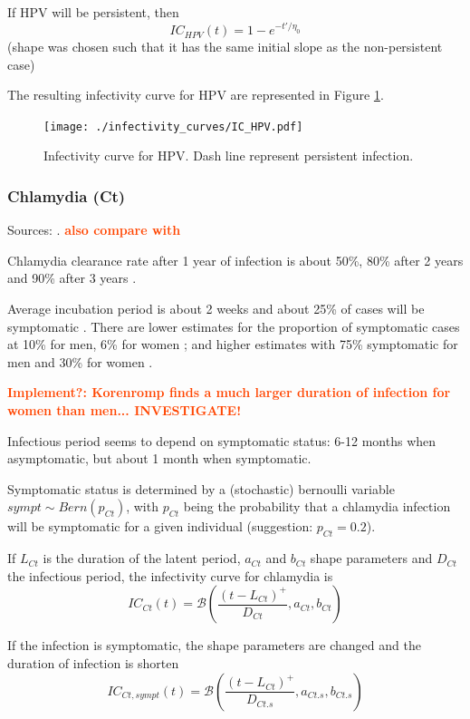 \documentclass[11pt, onecolumn]{article}
\newcommand{\warning}[1]{\textbf{\textcolor{OrangeRed}{#1}}}
\begin{document}
If HPV will be persistent, then 
$$IC_{HPV}(t) = 1- e^{-t'/\eta_0 }$$
(shape was chosen such that it has the same initial slope as the non-persistent case)

The resulting infectivity curve for HPV are represented in Figure \ref{fig:ICHPV}.
\begin{figure}[!ht]
\centering
    \texttt{[image: ./infectivity\_curves/IC\_HPV.pdf]}
\caption{Infectivity curve for HPV. Dash line represent persistent infection.}
\label{fig:ICHPV}
\end{figure}



\subsubsection{Chlamydia (Ct)}

Sources: \cite{Geisler:2010bc, Althaus:2011dc}. \warning{also compare with \cite{Hontelez:2013bc} \cite{Althaus:2012gg}}

Chlamydia clearance rate after 1 year of infection is about 50\%, 80\% after 2 years and 90\% after 3 years \cite{Geisler:2010bc}.

Average incubation period is about 2 weeks and about 25\% of cases will be symptomatic \cite{Althaus:2011dc}. There are lower estimates for the proportion of symptomatic cases at 10\% for men, 6\% for women \cite{Korenromp:2002gt}; and higher estimates with 75\% symptomatic for men and 30\% for women \cite{Kretzschmar:1996ur}.

\warning{Implement?: Korenromp\cite{Korenromp:2002gt} finds a much larger duration of infection for women than men... INVESTIGATE!}

Infectious period seems to depend on symptomatic status: 6-12 months when asymptomatic, but about 1 month when symptomatic\cite{Kretzschmar:2009cd}.

Symptomatic status is determined by a (stochastic) bernoulli variable $sympt\sim Bern(p_{Ct})$, with $p_{Ct}$ being the probability that a chlamydia infection will be symptomatic for a given individual (suggestion: $p_{Ct}=0.2$).

If $L_{Ct}$ is the duration of the latent period, $a_{Ct}$ and $b_{Ct}$ shape parameters and $D_{Ct}$ the infectious period, the infectivity curve for chlamydia is
$$IC_{Ct}(t) = \mathcal{B}\left(\frac{(t-L_{Ct})^+}{D_{Ct}},a_{Ct},b_{Ct}\right)$$

If the infection is symptomatic, the shape parameters are changed and the duration of infection is shorten
$$IC_{Ct,sympt}(t) = \mathcal{B}\left(\frac{(t-L_{Ct})^+}{D_{Ct.s}},a_{Ct.s},b_{Ct.s}\right)$$
\end{document}
